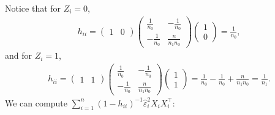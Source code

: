 \documentclass[10pt]{article}
\begin{document}
Notice that for $Z_i = 0$,
\begin{align*}
  h_{ii} 
  = \begin{pmatrix}
    1 & 0
  \end{pmatrix}
  \begin{pmatrix}
    \frac{1}{n_0} & -\frac{1}{n_0} \\
    -\frac{1}{n_0} & \frac{n}{n_1 n_0}
  \end{pmatrix}
  \begin{pmatrix}
    1 \\ 0
  \end{pmatrix}
  = \frac{1}{n_0},
\end{align*}
and for $Z_i = 1$,
\begin{align*}
  h_{ii} 
  = \begin{pmatrix}
    1 & 1
  \end{pmatrix}
  \begin{pmatrix}
    \frac{1}{n_0} & -\frac{1}{n_0} \\
    -\frac{1}{n_0} & \frac{n}{n_1 n_0}
  \end{pmatrix}
  \begin{pmatrix}
    1 \\ 1
  \end{pmatrix}
  = \frac{1}{n_0} - \frac{1}{n_0} + \frac{n}{n_1 n_0}
  = \frac{1}{n_1}.
\end{align*}
We can compute $\sum_{i=1}^n (1 - h_{ii})^{-1}\hat{\varepsilon}_i^2 X_i X_i^\intercal$:
\end{document}
